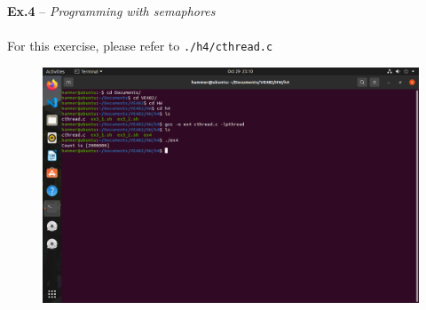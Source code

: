 \documentclass{article}
\begin{document}
\noindent\textbf{Ex.4} -- \textit{Programming with semaphores}\\ \\
For this exercise, please refer to \texttt{./h4/cthread.c}
\begin{figure}[htb]
    \centering
    \includegraphics[width=0.8\linewidth]{ex4.png}
\end{figure}
\end{document}
